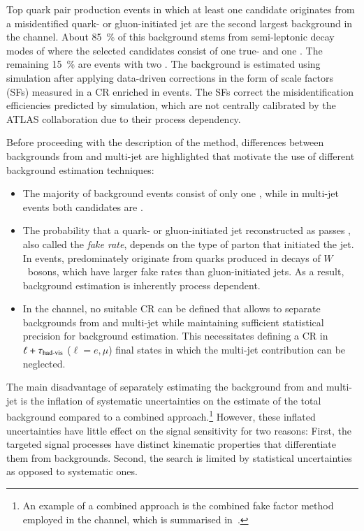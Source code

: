 Top quark pair production events in which at least one \tauhadvis candidate
originates from a misidentified quark- or gluon-initiated jet are the second
largest background in the \hadhad channel. About \SI{85}{\percent} of this
background stems from semi-leptonic decay modes of \ttbar where the selected
\tauhadvis candidates consist of one true- and one \faketauhadvis.  The
remaining \SI{15}{\percent} are \ttbarFakes events with two \faketauhadvis.
The \ttbarFakes background is estimated using simulation after applying
data-driven corrections in the form of \faketauhadvis scale factors (SFs)
measured in a CR enriched in \ttbar events. The SFs correct the \jettotauhadvis
misidentification efficiencies predicted by simulation, which are not centrally
calibrated by the ATLAS collaboration due to their process dependency.

Before proceeding with the description of the method, differences between
\faketauhadvis backgrounds from \ttbar and multi-jet are highlighted that
motivate the use of different background estimation techniques:
\begin{itemize}

\item The majority of \ttbarFakes background events consist of only one
  \faketauhadvis, while in multi-jet events both candidates are \faketauhadvis.

\item The probability that a quark- or gluon-initiated jet reconstructed as
  \tauhadvis passes \tauid, also called the \emph{fake rate}, depends on the
  type of parton that initiated the jet. In \ttbar events, \faketauhadvis
  predominately originate from quarks produced in decays of $W$~bosons, which
  have larger fake rates than gluon-initiated jets. As a result, \faketauhadvis
  background estimation is inherently process dependent.

\item In the \hadhad channel, no suitable \ttbarFakes CR can be defined that
  allows to separate \faketauhadvis backgrounds from \ttbar and multi-jet while
  maintaining sufficient statistical precision for background estimation. This
  necessitates defining a CR in $\ell + \tau_{\text{had-vis}}$ ($\ell = e, \mu$) final
  states in which the multi-jet contribution can be neglected.

\end{itemize}
The main disadvantage of separately estimating the \faketauhadvis background
from \ttbar and multi-jet is the inflation of systematic uncertainties on the
estimate of the total \faketauhadvis background compared to a combined
approach.\footnote{An example of a combined approach is the combined fake factor
  method employed in the \lephad channel, which is summarised
  in~.}  However, these inflated uncertainties
have little effect on the signal sensitivity for two reasons: First, the
targeted signal processes have distinct kinematic properties that differentiate
them from \faketauhadvis backgrounds. Second, the search is limited by
statistical uncertainties as opposed to systematic ones.


